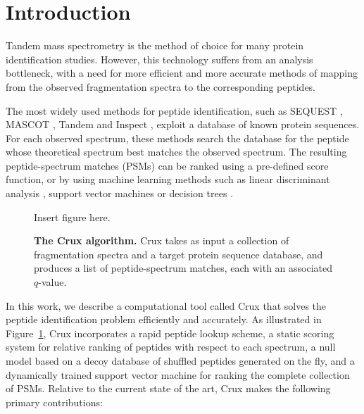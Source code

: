 \documentclass{bioinfo}
\begin{document}
\section{Introduction}

Tandem mass spectrometry is the method of choice for many protein
identification studies.  However, this technology suffers from an
analysis bottleneck, with a need for more efficient and more accurate
methods of mapping from the observed fragmentation spectra to the
corresponding peptides.

The most widely used methods for peptide identification, such as
SEQUEST \cite{eng:approach}, MASCOT \cite{}, Tandem \cite{} and
Inspect \cite{}, exploit a database of known protein sequences.  For
each observed spectrum, these methods search the database for the
peptide whose theoretical spectrum best matches the observed spectrum.
The resulting peptide-spectrum matches (PSMs) can be ranked using a
pre-defined score function, or by using machine learning methods such
as linear discriminant analysis \cite{keller:empirical}, support
vector machines \cite{anderson:new, kall:semi-supervised} or decision
trees \cite{elias:intensity}.

\begin{figure}
\centering
Insert figure here.
\caption{{\bf The Crux algorithm.}  Crux takes as input a collection
  of fragmentation spectra and a target protein sequence database, and
  produces a list of peptide-spectrum matches, each with an associated
  $q$-value.
  \label{figure:crux}}
\end{figure}

In this work, we describe a computational tool called Crux that solves
the peptide identification problem efficiently and accurately.  As
illustrated in Figure~\ref{figure:crux}, Crux incorporates a rapid
peptide lookup scheme, a static scoring system for relative ranking of
peptides with respect to each spectrum, a null model based on a decoy
database of shuffled peptides generated on the fly, and a dynamically
trained support vector machine for ranking the complete collection of
PSMs.  Relative to the current state of the art, Crux makes the
following primary contributions:
\end{document}
